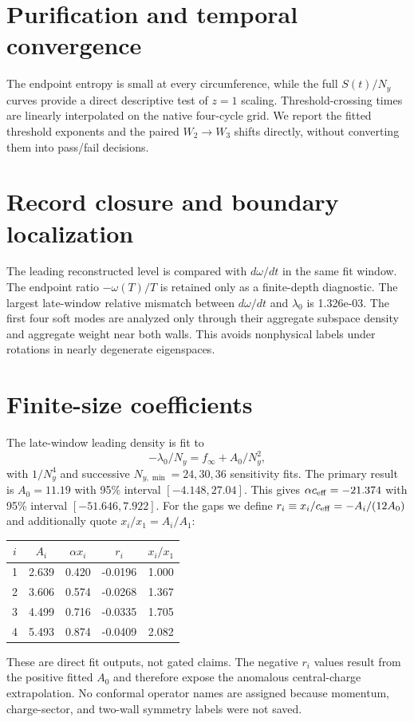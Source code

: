 \documentclass[aps,prb,twocolumn,nofootinbib,superscriptaddress]{revtex4-2}
\begin{document}
\section{Purification and temporal convergence}
The endpoint entropy is small at every circumference, while the full $S(t)/N_y$ curves provide a direct
descriptive test of $z=1$ scaling. Threshold-crossing times are linearly interpolated on the native
four-cycle grid. We report the fitted threshold exponents and the paired $W_2\to W_3$ shifts directly,
without converting them into pass/fail decisions.

\section{Record closure and boundary localization}
The leading reconstructed level is compared with $d\omega/dt$ in the same fit window. The endpoint ratio
$-\omega(T)/T$ is retained only as a finite-depth diagnostic. The largest late-window relative mismatch
between $d\omega/dt$ and $\lambda_0$ is 1.326e-03. The first four soft modes
are analyzed only through their aggregate subspace density and aggregate weight near both walls. This avoids
nonphysical labels under rotations in nearly degenerate eigenspaces.

\section{Finite-size coefficients}
The late-window leading density is fit to
\begin{equation}
 -\lambda_0/N_y=f_\infty+A_0/N_y^2,
\end{equation}
with $1/N_y^4$ and successive $N_{y,\min}=24,30,36$ sensitivity fits. The primary result is
$A_0=11.19$ with 95\% interval
$[-4.148,27.04]$.
This gives $\alpha c_{\rm eff}=-21.374$ with 95\% interval
$[-51.646,7.922]$.
For the gaps we define $r_i\equiv x_i/c_{\rm eff}=-A_i/(12A_0)$ and additionally quote
$x_i/x_1=A_i/A_1$:
\begin{center}
\begin{tabular}{ccccc}\toprule
$i$ & $A_i$ & $\alpha x_i$ & $r_i$ & $x_i/x_1$ \\\midrule
1 & 2.639 & 0.420 & -0.0196 & 1.000 \\
2 & 3.606 & 0.574 & -0.0268 & 1.367 \\
3 & 4.499 & 0.716 & -0.0335 & 1.705 \\
4 & 5.493 & 0.874 & -0.0409 & 2.082 \\
\bottomrule\end{tabular}
\end{center}
These are direct fit outputs, not gated claims. The negative $r_i$ values result from the positive fitted
$A_0$ and therefore expose the anomalous central-charge extrapolation. No conformal operator names are
assigned because momentum, charge-sector, and two-wall symmetry labels were not saved.
\end{document}
